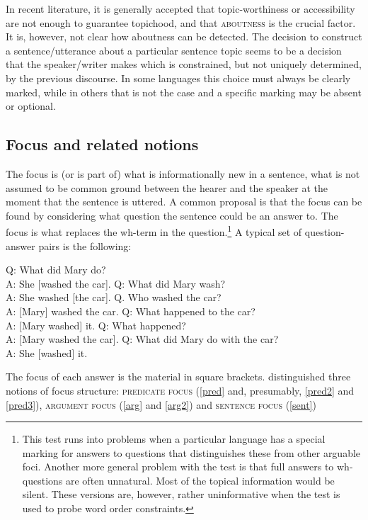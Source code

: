 \documentclass[output=paper,hidelinks]{langscibook}
\begin{document}
In recent literature, it is generally accepted that topic-worthiness or accessibility are not enough to guarantee topichood, and that \textsc{aboutness} is the crucial factor. It is, however, not clear how aboutness can be detected. The decision to construct a sentence/utterance about a particular sentence topic seems to be a decision that the speaker/writer makes which is constrained, but not uniquely determined, by the previous discourse. In some languages this choice must always be clearly marked, while in others that is not the case and a specific marking may be absent or optional.


\subsection{Focus and related notions} \label{focus}

The focus is (or is part of) what is informationally new in a sentence, what is not assumed to be common ground between the hearer and the speaker at the moment that the sentence is uttered. A common proposal is that the focus can be found by considering what question the sentence could be an answer to. The focus is what replaces the wh-term in the question.\footnote{This test runs into problems when a particular language has a special marking for answers to questions that distinguishes these from other arguable foci. Another more general problem with the test is that full answers to wh-questions are often unnatural. Most of the topical information would be silent. These versions are, however, rather uninformative when the test is used to probe word order constraints.} A typical set of question-answer pairs is the following:

\ea\label{pred}
   Q: What did Mary do? \\
   A: She [washed the car].
\z
\ea\label{arg}
    Q: What did Mary wash?\\
 A: She washed [the car].
\z
\ea\label{arg2} 
     Q. Who washed the car?\\
     A: [Mary] washed the car.
\z
\ea\label{pred2}
     Q: What happened to the car?\\
     A: [Mary washed] it. 
\z
\ea\label{sent}
     Q: What happened?\\
     A: [Mary washed the car].
\z
\ea\label{pred3}
     Q: What did Mary do with the car?\\
     A: She [washed] it.
\z

The focus of each answer is the material in square brackets. \citet{Lambrecht} distinguished three notions of focus structure: \textsc{predicate focus} (\ref{pred} and, presumably, \ref{pred2} and \ref{pred3}), \textsc{argument focus} (\ref{arg} and \ref{arg2}) and \textsc{sentence focus} (\ref{sent})
\end{document}
